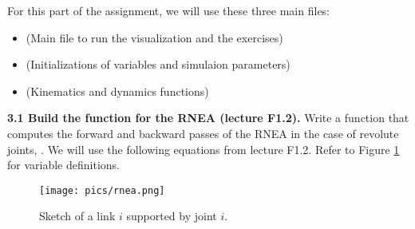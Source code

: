 \documentclass[11pt]{article}
\begin{document}
For this part of the assignment, we will use these three main files: 
\begin{itemize}
	\item {} (Main file to run the visualization and the exercises)
	\item {} (Initializations of variables and simulaion parameters)
	\item {} (Kinematics and dynamics functions)
\end{itemize}


\textbf{3.1 Build the function for the RNEA (lecture F1.2).} Write a function that computes the forward and backward passes of the RNEA in the case of revolute joints, . We will use the following equations from lecture F1.2. Refer to Figure \ref{fig:rnea} for variable definitions.


\begin{figure}[H]
	\centering
	\texttt{[image: pics/rnea.png]}
	\caption{Sketch of a link $i$ supported by joint $i$.}
	\label{fig:rnea}
\end{figure}
\end{document}
